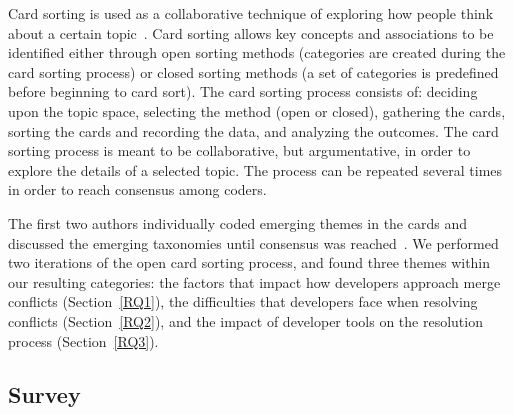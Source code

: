 Card sorting is used as a collaborative technique of exploring how people think about a certain topic~\cite{spencer2009card}\cite{card_sort}.
Card sorting allows key concepts and associations to be identified either through open sorting methods (categories are created during the card sorting process) or closed sorting methods (a set of categories is predefined before beginning to card sort).
The card sorting process consists of: deciding upon the topic space, selecting the method (open or closed), gathering the cards, sorting the cards and recording the data, and analyzing the outcomes.
The card sorting process is meant to be collaborative, but argumentative, in order to explore the details of a selected topic.
The process can be repeated several times in order to reach consensus among coders.

The first two authors individually coded emerging themes in the cards and discussed the emerging taxonomies until consensus was reached~\cite{card_sort}.
We performed two iterations of the open card sorting process, and found three themes within our resulting categories: the factors that impact how developers approach merge conflicts (Section~\ref{RQ1}), the difficulties that developers face when resolving conflicts (Section~\ref{RQ2}), and the impact of developer tools on the resolution process (Section~\ref{RQ3}).


\subsection{Survey}\label{survey_methods}

